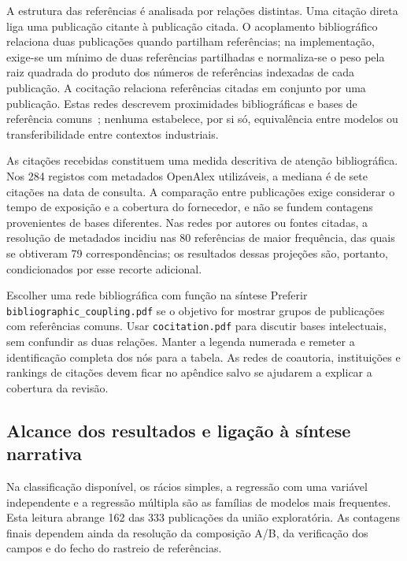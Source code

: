 A estrutura das referências é analisada por relações distintas.
Uma citação direta liga uma publicação citante à publicação citada.
O acoplamento bibliográfico relaciona duas publicações quando
partilham referências; na implementação, exige-se um mínimo de
duas referências partilhadas e normaliza-se o peso pela raiz
quadrada do produto dos números de referências indexadas de cada publicação. A cocitação
relaciona referências citadas em conjunto por uma publicação.
Estas redes descrevem proximidades bibliográficas e bases de
referência comuns~\cite{VanEck2010VOSviewer}; nenhuma estabelece,
por si só, equivalência entre modelos ou transferibilidade
entre contextos industriais.

As citações recebidas constituem uma medida descritiva de atenção
bibliográfica. Nos 284 registos com metadados OpenAlex utilizáveis,
a mediana é de sete citações na data de consulta. A comparação
entre publicações exige considerar o tempo de exposição e a
cobertura do fornecedor, e não se fundem contagens provenientes
de bases diferentes. Nas redes por autores ou fontes citadas,
a resolução de metadados incidiu nas 80 referências de maior
frequência, das quais se obtiveram 79 correspondências; os
resultados dessas projeções são, portanto, condicionados por
esse recorte adicional.

{Escolher uma rede bibliográfica com função na síntese}
{Preferir \texttt{bibliographic\_coupling.pdf} se o objetivo for
mostrar grupos de publicações com referências comuns. Usar
\texttt{cocitation.pdf} para discutir bases intelectuais, sem
confundir as duas relações. Manter a legenda numerada e remeter
a identificação completa dos nós para a tabela. As redes de
coautoria, instituições e rankings de citações devem ficar no
apêndice salvo se ajudarem a explicar a cobertura da revisão.}%

\subsection{Alcance dos resultados e ligação à síntese narrativa}

Na classificação disponível, os rácios simples, a regressão com uma variável
independente e a regressão múltipla são as famílias de modelos mais
frequentes. Esta leitura
abrange 162 das 333 publicações da união exploratória. As contagens
finais dependem ainda da resolução da composição A/B, da verificação
dos campos e do fecho do rastreio de referências.

